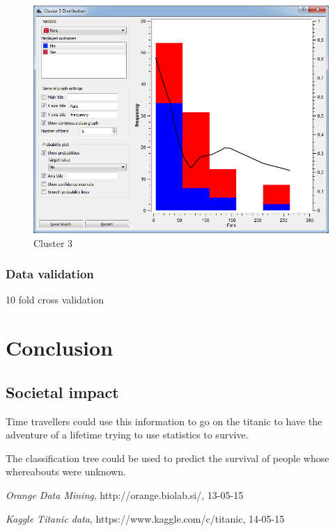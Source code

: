 \documentclass[a4paper,11pt]{article}
\begin{document}
\begin{figure}[h]
\begin{center}
		\includegraphics[scale=0.30]{ClusterDistribution/Cluster3/Fare}
	\end{center}
	\caption{Cluster 3}
	\label{ClusterThree}
\end{figure}


\subsubsection{Data validation}
10 fold cross validation
\clearpage
\section{Conclusion}
\subsection{Societal impact}
Time travellers could use this information to go on the titanic to have the adventure of a lifetime trying to use statistics to survive.

The classification tree could be used to predict the survival of people whose whereabouts were unknown.




\appendix
\begin{thebibliography}{9}

  \emph{Orange Data Mining},
  http://orange.biolab.si/,
  13-05-15
  
	\emph{Kaggle Titanic data},
	https://www.kaggle.com/c/titanic,
	14-05-15
\end{thebibliography}
\end{document}

